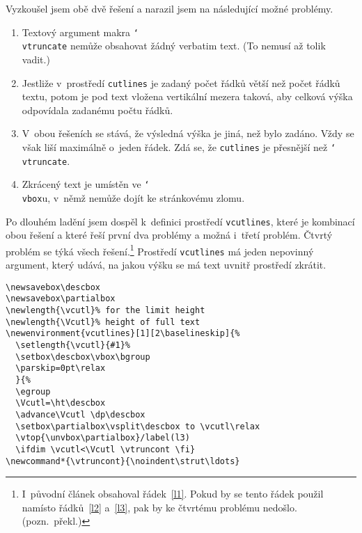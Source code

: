 \documentclass[oldcsbabel]{csbulletin}
\def\p#1{\texttt{\char`\\#1}}
\begin{document}
Vyzkoušel jsem obě dvě řešení a narazil jsem na následující možné problémy.
\begin{enumerate}
\item Textový argument makra \p{vtruncate} nemůže obsahovat žádný verbatim text. (To nemusí až tolik vadit.)
\item Jestliže v~prostředí \texttt{cutlines} je zadaný počet řádků větší než počet řádků textu, potom je pod text vložena vertikální mezera taková, aby celková výška odpovídala zadanému počtu řádků.
\item V~obou řešeních se stává, že výsledná výška je jiná, než bylo zadáno. Vždy se však liší maximálně o~jeden řádek. Zdá se, že \texttt{cutlines} je přesnější než \p{vtruncate}.
\item Zkrácený text je umístěn ve \p{vbox}u, v~němž nemůže dojít ke stránkovému zlomu.
\end{enumerate}

Po dlouhém ladění jsem dospěl k~definici prostředí \texttt{vcutlines}, které je kombinací obou řešení a které řeší první dva problémy a možná i~třetí problém. Čtvrtý problém se týká všech řešení.\footnote{I~původní článek obsahoval řádek~\ref{l1}. Pokud by se tento řádek použil namísto řádků~\ref{l2} a~\ref{l3}, pak by ke čtvrtému problému nedošlo. (pozn.~překl.)}
Prostředí \texttt{vcutlines} má jeden nepovinný argument, který udává, na jakou výšku se má text uvnitř prostředí zkrátit.


\newsavebox\descbox
\newsavebox\partialbox
\newlength{\vcutl}%
\newlength{\Vcutl}%
\newenvironment{vcutlines}[1][2\baselineskip]{%
  \setlength{\vcutl}{#1}%
  \setbox\descbox\vbox\bgroup
  \parskip=0pt\relax
  }{%
  \egroup
  \Vcutl=\ht\descbox
  \advance\Vcutl \dp\descbox
  \setbox\partialbox\vsplit\descbox to \vcutl\relax
  \vtop{\unvbox\partialbox}
  \ifdim \vcutl<\Vcutl \vtruncont \fi}
\newcommand*{\vtruncont}{\noindent\strut\ldots}

\begin{Verbatim}[commandchars=/()]
\newsavebox\descbox
\newsavebox\partialbox
\newlength{\vcutl}% for the limit height
\newlength{\Vcutl}% height of full text
\newenvironment{vcutlines}[1][2\baselineskip]{%
  \setlength{\vcutl}{#1}%
  \setbox\descbox\vbox\bgroup
  \parskip=0pt\relax
  }{%
  \egroup
  \Vcutl=\ht\descbox
  \advance\Vcutl \dp\descbox
  \setbox\partialbox\vsplit\descbox to \vcutl\relax
  \vtop{\unvbox\partialbox}/label(l3)
  \ifdim \vcutl<\Vcutl \vtruncont \fi}
\newcommand*{\vtruncont}{\noindent\strut\ldots}
\end{Verbatim}
\end{document}

